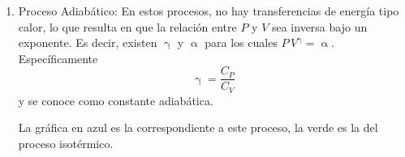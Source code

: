 \begin{enumerate}
        Pasando ahora a las transferencias de energía que se deben
        presentar en este tipo de procesos.
        \[
          \begin{derivation}
              \res{ \Updelta U = Q + T_r }\\
            \equiv\\
              \res{ \Updelta U = n\,C_p\,(T_f - T_0) - \Int{V_0,V_f}P\,\diff{V} }\\
            \why{ La presión es constante }\\
              \res{ \Updelta U = n\,C_p\,(T_f - T_0) - P_0\,(V_f - V_0) }
          \end{derivation}
        \]
  \item Proceso Adiabático:
        En estos procesos, no hay transferencias de energía tipo calor,
        lo que resulta en que la relación entre $P$ y $V$ sea inversa
        bajo un exponente. Es decir, existen $\upgamma$ y $\upalpha$
        para los cuales $P\,V^\upgamma = \upalpha$. Específicamente
        \[\upgamma = \frac{C_P}{C_V}\]
        y se conoce como constante adiabática.
        
        La gráfica en azul es la correspondiente a este proceso, la
        verde es la del proceso isotérmico.

        \begin{center}
        \end{center}


\end{enumerate}

